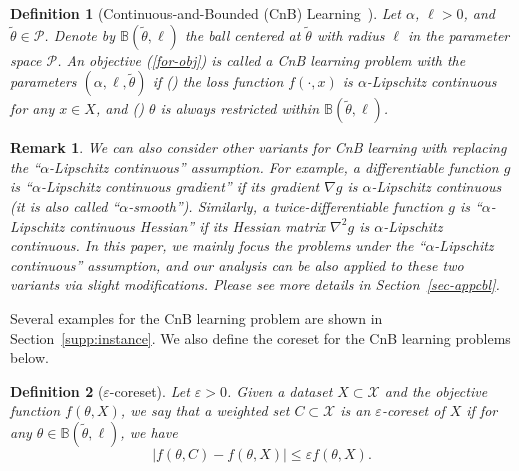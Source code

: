 \documentclass{article}
\newcommand{\rmnum}[1]{\romannumeral #1}
\newtheorem{definition}{Definition}
\newtheorem{remark}[lemma]{Remark}
\begin{document}
\begin{definition}[Continuous-and-Bounded (CnB) Learning~\cite{understandingML}]\label{def:CB-learning} 
Let $\alpha$, $\ell>0$, and $\tilde{\theta}\in \mathcal{P}$. Denote by $\mathbb{B}(\tilde{\theta}, \ell)$ the ball centered at $\tilde{\theta}$ with radius   $ \ell $ in the parameter space $\mathcal{P}$.	An objective (\ref{for-obj}) is called a CnB  learning problem with the parameters $( \alpha,\ell, \tilde{\theta} )$ if (\rmnum{1}) the loss function $ f(\cdot,x) $ is $\alpha $-Lipschitz continuous for any $x\in X$, and (\rmnum{2})  $\theta $ is always restricted within $\mathbb{B}(\tilde{\theta}, \ell)$. 
\end{definition}
\begin{remark}
\label{rem-cnb}
We can also consider other variants for CnB learning with replacing the ``$\alpha $-Lipschitz continuous'' assumption. For example, a differentiable   function $ g $ is ``$ \alpha $-Lipschitz continuous gradient''   if its gradient  $ \nabla g $  is $ \alpha $-Lipschitz continuous (it is also called ``$ \alpha $-smooth'').   Similarly, a  twice-differentiable function $ g$ is  ``$ \alpha $-Lipschitz continuous Hessian'' if its  Hessian matrix  $ \nabla^2 g $ is $ \alpha $-Lipschitz continuous.   In this paper, we mainly focus the problems under the ``$\alpha $-Lipschitz continuous'' assumption, and our analysis can be also applied to these two variants via slight modifications. Please see more details in Section~\ref{sec-appcbl}.
\end{remark}

Several examples for the CnB learning problem are shown in Section~\ref{supp:instance}. 
We also define the coreset for the CnB learning problems below. 
\begin{definition}[$ \varepsilon $-coreset]
\label{def-coreset}
	Let $\varepsilon>0$. Given a dataset $ X\subset \mathcal{X} $ and the objective function $ f(\theta,X) $,  we say that a weighted set $ C\subset\mathcal{X} $ is an \emph{$ \varepsilon $-coreset} of $ X $ if for any $ \theta\in\mathbb{B}(\tilde{\theta}, \ell) $, we have
\begin{equation}\label{coreset}
	|f(\theta,C)-f(\theta,X)| \leq \varepsilon f(\theta,X).
\end{equation} 
\end{definition}
\end{document}
